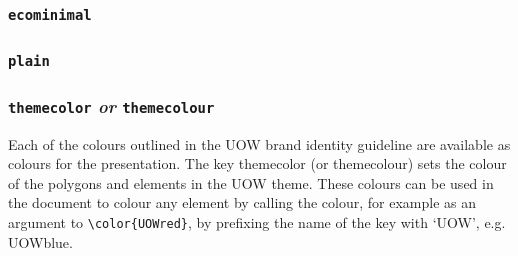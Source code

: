\documentclass[a4paper,oneside,12pt]{article}
\newcommand{\key}[1]{\texttt{\color{UOWorange}#1}}
\newcommand{\val}[1]{\texttt{\color{UOWblue}#1}}
\newcommand{\command}[1]{\texttt{\color{UOWdarkgreen}#1}}
\begin{document}
\subsubsection*{\val{ecominimal}}%
\par

\subsubsection*{\val{plain}}%
\par

\subsubsection*{\key{themecolor} \textit{or} \key{themecolour}}
Each of the colours outlined in the UOW brand identity guideline are available as colours for the presentation. The key themecolor (or themecolour) sets the colour of the polygons and elements in the UOW theme. These colours can be used in the document to colour any element by calling the colour, for example as an argument to \command{\textbackslash{}color\{UOWred\}}, by prefixing the name of the key with `UOW', e.g. UOWblue.
\end{document}
